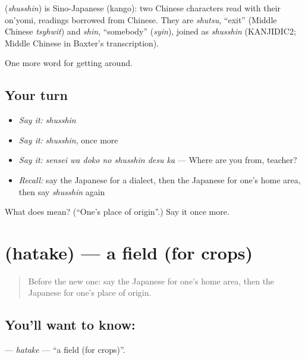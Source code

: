 \begin{cousinweb}
\textbf{} (\emph{shusshin}) is Sino-Japanese (kango): two Chinese characters read with their on'yomi, readings borrowed from Chinese. They are \emph{shutsu}, \textquotedblleft{}exit\textquotedblright{} (Middle Chinese \emph{tsyhwit}) and \emph{shin}, \textquotedblleft{}somebody\textquotedblright{} (\emph{syin}), joined as \emph{shusshin} (KANJIDIC2; Middle Chinese in Baxter's transcription).
\end{cousinweb}

\begin{grammarlens}[title={What you've built}]
One more word for getting around.
\end{grammarlens}

\subsection*{Your turn}
\begin{itemize}
\raggedright
  \item \emph{Say it:} \emph{shusshin}
  \item \emph{Say it:} \emph{shusshin}, once more
  \item \emph{Say it:} \emph{sensei wa doko no shusshin desu ka} — Where are you from, teacher?
  \item \emph{Recall:} say the Japanese for a dialect, then the Japanese for one's home area, then say \emph{shusshin} again
\end{itemize}

\begin{tcolorbox}[breakable,colback=teal!4,colframe=teal!35!black,title={Before you move on}]
What does  mean? (\textquotedblleft{}One's place of origin\textquotedblright{}.) Say it once more.
\end{tcolorbox}
\section[\texorpdfstring{\ja{はたけ} (hatake)}{はたけ (hatake)}]{ (hatake) — a field (for crops)}

\label{lesson:JA-C410-hatake}



\begin{quote}
Before the new one: say the Japanese for one's home area, then the Japanese for one's place of origin.
\end{quote}

\subsection*{You'll want to know: }
\textbf{} — \emph{hatake} — \textquotedblleft{}a field (for crops)\textquotedblright{}.

